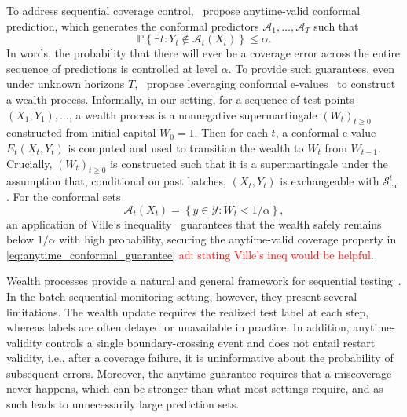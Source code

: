 \documentclass{uai2026} %
\newcommand{\1}{\mathbf{1}}
\newcommand{\prob}{\mathbb{P}}
\newcommand{\ycal}{\mathcal{Y}}
\newcommand{\scal}{\mathcal{S}}
\newcommand{\ens}[1]{\left\{#1\right\}}
\newcommand{\cali}{\mathrm{cal}}
\newcommand{\scalcal}{\scal_{\cali}}
\newcommand{\acal}{\mathcal{A}}
\newcommand{\aymeric}[1]{\textcolor{red}{ad: #1}}
\begin{document}
To address sequential coverage control,~\citet{gauthier2025values} propose anytime-valid conformal prediction, which generates the conformal predictors $\acal_1, \ldots, \acal_T$ such that
\begin{equation}
  \label{eq:anytime_conformal_guarantee}
  \prob\ens{\exists t: Y_t\not\in \acal_t(X_t)} \le \alpha.
\end{equation}
In words, the probability that there will ever be a coverage error across the entire sequence of predictions is controlled at level $\alpha$. To provide such guarantees, even under unknown horizons $T$,~\citet{gauthier2025values} propose leveraging conformal e-values~\citep{grunwald2020safe} to construct a wealth process. Informally, in our setting, for a sequence of test points $(X_1, Y_1), \ldots$, a wealth process is a nonnegative supermartingale $(W_t)_{t\ge 0}$ constructed from initial capital $W_0=1$. Then for each $t$, a conformal e-value $E_t(X_t, Y_t)$ is computed and used to transition the wealth to $W_t$ from $W_{t-1}$. Crucially, $(W_t)_{t\ge 0}$ is constructed such that it is a supermartingale under the assumption that, conditional on past batches, $(X_t,Y_t)$ is exchangeable with $\scalcal^t$. For the conformal sets
\begin{equation*}
  \acal_t(X_t) = \ens{y \in \ycal : W_{t} < 1/\alpha},
\end{equation*}
an application of Ville's inequality~\citep{ville1939etude} guarantees that the wealth safely remains below $1/\alpha$ with high probability, securing the anytime-valid coverage property in \eqref{eq:anytime_conformal_guarantee} \aymeric{stating Ville's ineq would be helpful}.

Wealth processes provide a natural and general framework for sequential testing~\citep{shafer2011test,ramdas2023game}. In the batch-sequential monitoring setting, however, they present several limitations. The wealth update requires the realized test label at each step, whereas labels are often delayed or unavailable in practice. In addition, anytime-validity controls a single boundary-crossing event and does not entail restart validity, i.e., after a coverage failure, it is uninformative about the probability of subsequent errors. Moreover, the anytime guarantee requires that a miscoverage never happens, which can be stronger than what most settings require, and as such leads to unnecessarily large prediction sets.
\end{document}
